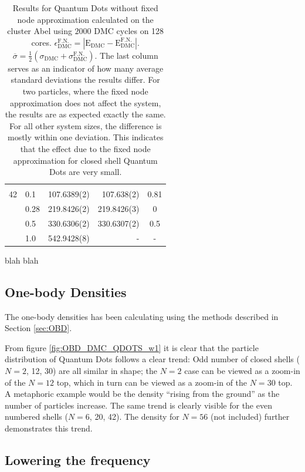 \begin{table}
\begin{center}
\begin{tabular}{rl|rrc}
\cline{2-5}
\multicolumn{5}{c}{} \\
    42    &   0.1    & 107.6389(2) & 107.638(2) & 0.81 \\
          &   0.28   & 219.8426(2) & 219.8426(3)& 0 \\
          &   0.5    & 330.6306(2) & 330.6307(2)& 0.5 \\
          &   1.0    & 542.9428(8) &    -       & - \\
\hline\hline
\end{tabular}
\caption{Results for Quantum Dots without fixed node approximation calculated on the cluster Abel using $2000$ DMC cycles on 128 cores. $\epsilon_\mathrm{DMC}^\mathrm{F.N.} = |\mathrm{E_{DMC}} - \mathrm{E_{DMC}^{F.N.}}|$. $\overline{\sigma}  = \frac{1}{2}(\sigma_\mathrm{DMC} + \sigma_\mathrm{DMC}^\mathrm{F.N.})$. The last column serves as an indicator of how many average standard deviations the results differ. For two particles, where the fixed node approximation does not affect the system, the results are as expected exactly the same. For all other system sizes, the difference is mostly within one deviation. This indicates that the effect due to the fixed node approximation for closed shell Quantum Dots are very small.}
\end{center}
\end{table}

blah blah

\clearpage

\subsection{One-body Densities}

The one-body densities has been calculating using the methods described in Section \ref{sec:OBD}.

From figure \ref{fig:OBD_DMC_QDOTS_w1} it is clear that the particle distribution of Quantum Dots follows a clear trend: Odd number of closed shells ($N=2$, 12, 30) are all similar in shape; the $N=2$ case can be viewed as a zoom-in of the $N=12$ top, which in turn can be viewed as a zoom-in of the $N=30$ top. A metaphoric example would be the density ``rising from the ground'' as the number of particles increase. The same trend is clearly visible for the even numbered shells ($N=6$, 20, 42). The density for $N=56$ (not included) further demonstrates this trend.

\subsection{Lowering the frequency}

